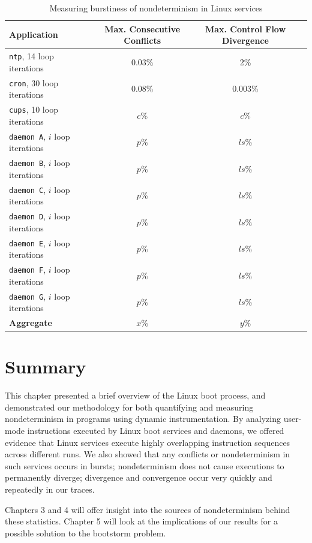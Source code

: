 \begin{table}[h]
\caption{Measuring burstiness of nondeterminism in Linux services} 
\label{burst:stats}
\begin{center}
\begin{tabular}{||l|c|c|c||}\hline
  Application & Max. Consecutive Conflicts & Max. Control Flow Divergence \\
  \hline \hline
  \texttt{ntp}, 14 loop iterations & 0.03\% & 2\% 
  \\\hline
  \texttt{cron}, 30 loop iterations & 0.08\% & 0.003\% 
  \\\hline 
  \texttt{cups}, 10 loop iterations & $c$\% & $c$\% 
  \\\hline 
  \texttt{daemon A}, $i$ loop iterations & $p$\% & $ls$\% 
  \\\hline 
  \texttt{daemon B}, $i$ loop iterations & $p$\% & $ls$\% 
  \\\hline 
  \texttt{daemon C}, $i$ loop iterations & $p$\% & $ls$\% 
  \\\hline 
  \texttt{daemon D}, $i$ loop iterations & $p$\% & $ls$\% 
  \\\hline 
  \texttt{daemon E}, $i$ loop iterations & $p$\% & $ls$\% 
  \\\hline 
  \texttt{daemon F}, $i$ loop iterations & $p$\% & $ls$\% 
  \\\hline 
  \texttt{daemon G}, $i$ loop iterations & $p$\% & $ls$\% 
  \\\hline 
  \hline 
  {\bf Aggregate} & {\bf $x$}\% & {\bf $y$}\% %
  \\\hline 
\end{tabular}
\end{center}
\end{table}

\section{Summary}
This chapter presented a brief overview of the Linux boot process,
and demonstrated our methodology for both quantifying and measuring nondeterminism
in programs using dynamic instrumentation. By analyzing user-mode
instructions executed by Linux boot services and daemons, we offered
evidence that Linux services execute highly overlapping instruction
sequences across different runs. We also showed
that any conflicts or nondeterminism in such services occurs in bursts;
nondeterminism does not cause executions to permanently diverge;
divergence and convergence occur very quickly and repeatedly in our
traces.

Chapters 3 and 4 will offer insight into the sources 
of nondeterminism behind these statistics. 
Chapter 5 will look at the implications of our results for a possible
solution to the bootstorm problem.

